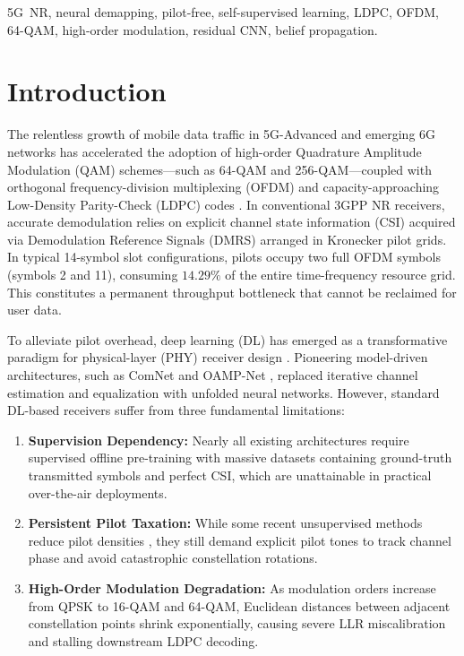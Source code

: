﻿\documentclass[journal,twoside]{IEEEtran}
\begin{document}
\begin{IEEEkeywords}
5G~NR, neural demapping, pilot-free, self-supervised learning, LDPC,
OFDM, 64-QAM, high-order modulation, residual CNN, belief propagation.
\end{IEEEkeywords}

\section{Introduction}\label{sec:intro}

The relentless growth of mobile data traffic in 5G-Advanced and emerging 6G
networks has accelerated the adoption of high-order Quadrature Amplitude
Modulation (QAM) schemes---such as 64-QAM and 256-QAM---coupled with orthogonal
frequency-division multiplexing (OFDM) and capacity-approaching Low-Density
Parity-Check (LDPC) codes \cite{3gpp38211}.
In conventional 3GPP NR receivers, accurate demodulation relies on explicit
channel state information (CSI) acquired via Demodulation Reference Signals (DMRS)
arranged in Kronecker pilot grids.
In typical 14-symbol slot configurations, pilots occupy two full OFDM symbols
(symbols 2 and 11), consuming $14.29\%$ of the entire time-frequency resource
grid. This constitutes a permanent throughput bottleneck that cannot be
reclaimed for user data.

To alleviate pilot overhead, deep learning (DL) has emerged as a transformative
paradigm for physical-layer (PHY) receiver design
\cite{ye2018,he2019,honkala2021,hoydis2022}.
Pioneering model-driven architectures, such as ComNet \cite{ye2018} and
OAMP-Net \cite{he2019}, replaced iterative channel estimation and equalization
with unfolded neural networks.
However, standard DL-based receivers suffer from three fundamental limitations:
\begin{enumerate}
    \item \textbf{Supervision Dependency:} Nearly all existing architectures
    \cite{ye2018,honkala2021,pratik2024} require supervised offline pre-training
    with massive datasets containing ground-truth transmitted symbols and perfect CSI,
    which are unattainable in practical over-the-air deployments.
    \item \textbf{Persistent Pilot Taxation:} While some recent unsupervised
    methods reduce pilot densities \cite{zhang2023,wu2024}, they still demand
    explicit pilot tones to track channel phase and avoid catastrophic constellation
    rotations.
    \item \textbf{High-Order Modulation Degradation:} As modulation orders increase
    from QPSK to 16-QAM and 64-QAM, Euclidean distances between adjacent constellation
    points shrink exponentially, causing severe LLR miscalibration and stalling
    downstream LDPC decoding.
\end{enumerate}
\end{document}
